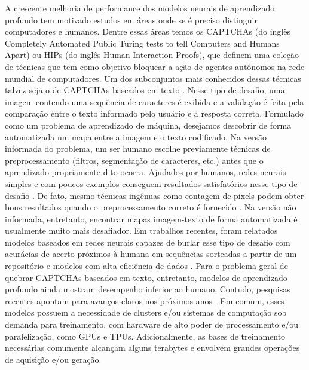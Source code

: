 A crescente melhoria de performance dos modelos neurais de aprendizado profundo tem motivado estudos em áreas onde se é preciso distinguir computadores e humanos. Dentre essas áreas temos os CAPTCHAs \cite{captcha2003} (do inglês Completely Automated  Public  Turing  tests  to  tell  Computers  and Humans Apart) ou HIPs \cite{lectures2005HIP} (do inglês Human Interaction Proofs), que definem uma coleção de técnicas que tem como objetivo bloquear a ação de agentes autônomos na rede mundial de computadores. Um dos subconjuntos mais conhecidos dessas técnicas talvez seja o de CAPTCHAs baseados em texto \cite{captcha_review_2017}. Nesse tipo de desafio, uma imagem contendo uma sequência de caracteres é exibida e a validação é feita pela comparação entre o texto informado pelo usuário e a resposta correta. Formulado como um problema de aprendizado de máquina, desejamos descobrir de forma automatizada um mapa entre a imagem e o texto codificado. Na versão informada do problema, um ser humano escolhe previamente técnicas de preprocessamento (filtros, segmentação de caracteres, etc.) antes que o aprendizado propriamente dito ocorra. Ajudados por humanos, redes neurais simples e com poucos exemplos conseguem resultados satisfatórios nesse tipo de desafio \cite{lectures2005HIP}. De fato, mesmo técnicas ingênuas como contagem de pixels podem obter bons resultados quando o preprocessamento correto é fornecido \cite{naivecaptcha}. Na versão não informada, entretanto, encontrar mapas imagem-texto de forma automatizada é usualmente muito mais desafiador. Em trabalhos recentes, foram relatados modelos baseados em redes neurais capazes de burlar esse tipo de desafio com acurácias de acerto próximos à humana em sequências sorteadas a partir de um repositório \cite{captcha_break_2013} e modelos com alta eficiência de dados \cite{captcha_break_2017}. Para o problema geral de quebrar CAPTCHAs baseados em texto, entretanto, modelos de aprendizado profundo ainda mostram desempenho inferior ao humano. Contudo, pesquisas recentes apontam para avanços claros nos próximos anos \cite{Bursztein2014TheEI}. Em comum, esses modelos possuem a necessidade de clusters e/ou sistemas de computação sob demanda para treinamento, com hardware de alto poder de processamento e/ou paralelização, como GPUs e TPUs. Adicionalmente, as bases de treinamento necessárias comumente alcançam alguns terabytes e envolvem grandes operações de aquisição e/ou geração.

